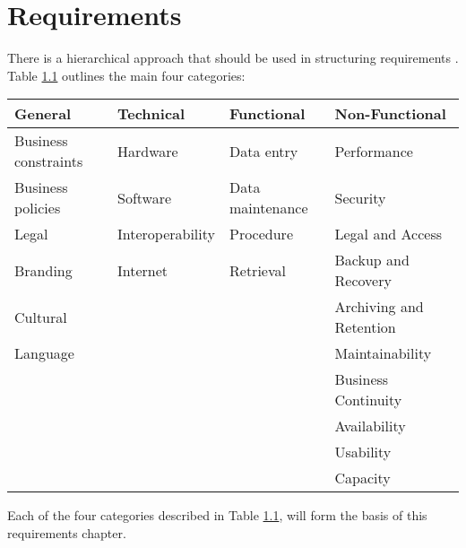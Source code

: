 \chapter{Requirements}
\label{chap:requirements}
There is a hierarchical approach that should be used in structuring 
requirements \citep{cadle10}. Table \ref{table:requirementsCategories} outlines
the main four categories:

\begin{table}[H]
  \begin{tabular}{|l|l|l|l|}
    \hline
    {\bf General} & {\bf Technical} & {\bf Functional} & {\bf Non-Functional} \\ 
    \hline
    Business constraints & Hardware & Data entry & Performance \\ 
    Business policies & Software & Data maintenance & Security \\ 
    Legal & Interoperability & Procedure & Legal and Access \\ 
    Branding & Internet & Retrieval & Backup and Recovery \\ 
    Cultural & ~ & ~ & Archiving and Retention \\ 
    Language & ~ & ~ & Maintainability \\ 
    ~ & ~ & ~ & Business Continuity \\ 
    ~ & ~ & ~ & Availability \\ 
    ~ & ~ & ~ & Usability \\ 
    ~ & ~ & ~ & Capacity \\
    \hline
  \end{tabular}
  \label{table:requirementsCategories}
\end{table}

Each of the four categories described in Table \ref{table:requirementsCategories}, 
will form the basis of this requirements chapter.


\newpage


\newpage


\newpage


\newpage


\newpage


\newpage

